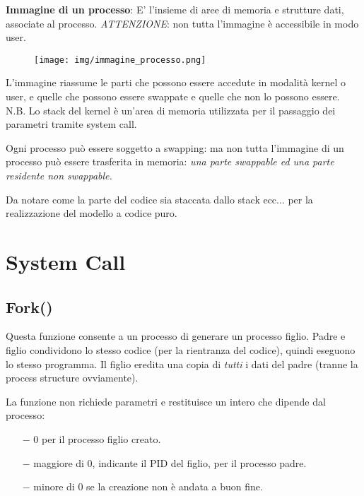 \documentclass{article}
\begin{document}
\noindent \textbf{Immagine di un processo}: E' l'insieme di aree di memoria e
strutture dati, associate al processo. \textit{ATTENZIONE}: non tutta 
l'immagine è accessibile in modo user.

\begin{figure}[h!]
    \begin{center}
        \texttt{[image: img/immagine\_processo.png]}  
    \end{center}
\end{figure}

\noindent L'immagine riassume le parti che possono essere accedute in modalità 
kernel o user, e quelle che possono essere swappate e quelle che non lo possono
essere. 
N.B. Lo stack del kernel è un'area di memoria utilizzata per il passaggio dei 
parametri tramite system call.

\noindent Ogni processo può essere soggetto a swapping:
ma non tutta l'immagine di un processo può essere trasferita in memoria: 
\textit{una parte swappable ed una parte residente non swappable.}
\medskip

\noindent Da notare come la parte del codice sia staccata dallo stack ecc... per la realizzazione del 
modello a codice puro.

\pagebreak
\section{System Call}
\subsection{Fork()}

\noindent{}
\medskip

\noindent Questa funzione consente a un processo di generare un processo figlio.
Padre e figlio condividono lo stesso codice (per la rientranza del codice),
quindi eseguono lo stesso programma. Il figlio eredita una copia di \textit{tutti}
i dati del padre (tranne la process structure ovviamente).

La funzione non richiede parametri e restituisce un intero che dipende dal processo:
\begin{itemize}
    \item[$-$] 0 per il processo figlio creato.
    \item[$-$] maggiore di 0, indicante il PID del figlio, per il processo padre.
    \item[$-$] minore di 0 se la creazione non è andata a buon fine.
\end{itemize}
\end{document}
